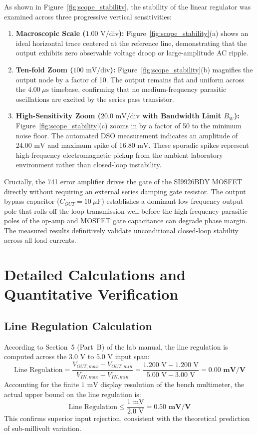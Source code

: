 \documentclass[11pt,a4paper]{article}
\begin{document}
As shown in Figure~\ref{fig:scope_stability}, the stability of the linear regulator was examined across three progressive vertical sensitivities:
\begin{enumerate}
    \item \textbf{Macroscopic Scale ($1.00\text{ V/div}$):} Figure~\ref{fig:scope_stability}(a) shows an ideal horizontal trace centered at the reference line, demonstrating that the output exhibits zero observable voltage droop or large-amplitude AC ripple.
    \item \textbf{Ten-fold Zoom ($100\text{ mV/div}$):} Figure~\ref{fig:scope_stability}(b) magnifies the output node by a factor of 10. The output remains flat and uniform across the $4.00\ \mu\text{s}$ timebase, confirming that no medium-frequency parasitic oscillations are excited by the series pass transistor.
    \item \textbf{High-Sensitivity Zoom ($20.0\text{ mV/div}$ with Bandwidth Limit $B_W$):} Figure~\ref{fig:scope_stability}(c) zooms in by a factor of 50 to the minimum noise floor. The automated DSO measurement indicates an amplitude of $24.00\text{ mV}$ and maximum spike of $16.80\text{ mV}$. These sporadic spikes represent high-frequency electromagnetic pickup from the ambient laboratory environment rather than closed-loop instability.
\end{enumerate}

Crucially, the 741 error amplifier drives the gate of the SI9926BDY MOSFET directly without requiring an external series damping gate resistor. The output bypass capacitor ($C_{OUT} = 10\ \mu\text{F}$) establishes a dominant low-frequency output pole that rolls off the loop transmission well before the high-frequency parasitic poles of the op-amp and MOSFET gate capacitance can degrade phase margin. The measured results definitively validate unconditional closed-loop stability across all load currents.

\section{Detailed Calculations and Quantitative Verification}

\subsection{Line Regulation Calculation}
According to Section~5 (Part~B) of the lab manual, the line regulation is computed across the $3.0\text{ V}$ to $5.0\text{ V}$ input span:
\begin{equation}
    \text{Line Regulation} = \frac{V_{OUT,max} - V_{OUT,min}}{V_{IN,max} - V_{IN,min}} = \frac{1.200\text{ V} - 1.200\text{ V}}{5.00\text{ V} - 3.00\text{ V}} = \mathbf{0.00\text{ mV/V}}
\end{equation}
Accounting for the finite $1\text{ mV}$ display resolution of the bench multimeter, the actual upper bound on the line regulation is:
\begin{equation}
    \text{Line Regulation} \le \frac{1\text{ mV}}{2.0\text{ V}} = \mathbf{0.50\text{ mV/V}}
\end{equation}
This confirms superior input rejection, consistent with the theoretical prediction of sub-millivolt variation.
\end{document}
